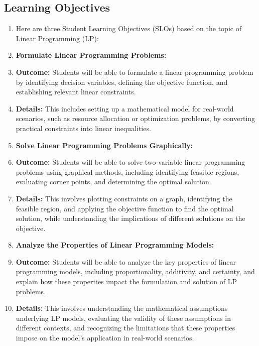\subsection{Learning Objectives}
\label{ssec:lear-fe6e}


\begin{enumerate}
    \item Here are three Student Learning Objectives (SLOs) based on the topic of Linear Programming (LP):
    \item \textbf{Formulate Linear Programming Problems:}
    \item \textbf{Outcome:} Students will be able to formulate a linear programming problem by identifying decision variables, defining the objective function, and establishing relevant linear constraints.
    \item \textbf{Details:} This includes setting up a mathematical model for real-world scenarios, such as resource allocation or optimization problems, by converting practical constraints into linear inequalities.
    \item \textbf{Solve Linear Programming Problems Graphically:}
    \item \textbf{Outcome:} Students will be able to solve two-variable linear programming problems using graphical methods, including identifying feasible regions, evaluating corner points, and determining the optimal solution.
    \item \textbf{Details:} This involves plotting constraints on a graph, identifying the feasible region, and applying the objective function to find the optimal solution, while understanding the implications of different solutions on the objective.
    \item \textbf{Analyze the Properties of Linear Programming Models:}
    \item \textbf{Outcome:} Students will be able to analyze the key properties of linear programming models, including proportionality, additivity, and certainty, and explain how these properties impact the formulation and solution of LP problems.
    \item \textbf{Details:} This involves understanding the mathematical assumptions underlying LP models, evaluating the validity of these assumptions in different contexts, and recognizing the limitations that these properties impose on the model's application in real-world scenarios.
\end{enumerate}


